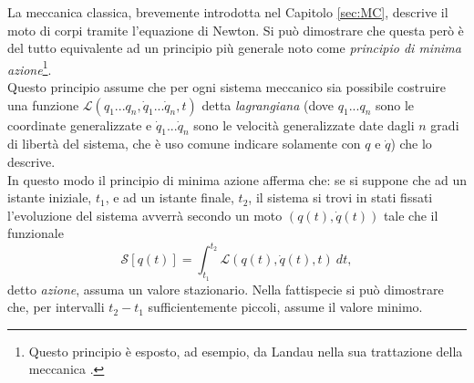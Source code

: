 \label{sec:MinimaAzione}
La meccanica classica, brevemente introdotta nel Capitolo \ref{sec:MC}, descrive il moto di corpi tramite l'equazione di Newton. Si può dimostrare che questa però è del tutto equivalente ad un principio più generale noto come \emph{principio di minima azione}\footnote{Questo principio è esposto, ad esempio, da Landau nella sua trattazione della meccanica \cite{Landau1}.}.\\ Questo principio assume che per ogni sistema meccanico sia possibile costruire una funzione $\mathcal{L}(q_1...q_n,\dot{q}_1...\dot{q}_n,t)$ detta \emph{lagrangiana} (dove $q_1...q_n$ sono le coordinate generalizzate e $\dot{q}_1...\dot{q}_n$ sono le velocità generalizzate date dagli $n$ gradi di libertà del sistema, che è uso comune indicare solamente con $q$ e $\dot{q}$) che lo descrive.\\ In questo modo il principio di minima azione afferma che: se si suppone che ad un istante iniziale, $t_1$, e ad un istante finale, $t_2$, il sistema si trovi in stati fissati l'evoluzione del sistema avverrà secondo un moto $(q(t),\dot{q}(t))$ tale che il funzionale 
\begin{equation}
    \label{Azione}
    \mathcal{S}[q(t)] =\int_{t_1}^{t_2} \mathcal{L}(q(t),\dot{q}(t),t)\ dt,
\end{equation}
detto \emph{azione}, assuma un valore stazionario. Nella fattispecie si può dimostrare che, per intervalli $t_2-t_1$ sufficientemente piccoli, assume il valore minimo.\\

